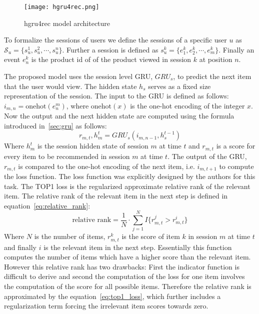 \begin{figure}[ht]
	\centering
	\captionsetup{width=0.8\textwidth}
    \texttt{[image: hgru4rec.png]}
    \caption{hgru4rec model architecture}
    \label{fig:hgru4rec}
\end{figure}

To formalize the sessions of users we define the sessions of a specific user $u$ as $\mathcal{S}_u = \lbrace s_u^1, s_u^2, \cdots, s_u^n \rbrace $.
Further a session is defined as $s_u^k = \lbrace e^k_1, e^k_2, \cdots, e^k_m \rbrace $.
Finally an event $e^k_n$ is the product id of of the product viewed in session $k$ at position $n$.
\par
The proposed model uses the session level GRU, $GRU_s$, to predict the next item that the user would view.
The hidden state $h_s$ serves as a fixed size representation of the session.
The input to the GRU is defined as follows: $i_{m,n} = \text{onehot} ( e^m_n )$, where $\text{onehot}(x)$ is the one-hot encoding of the integer $x$.
Now the output and the next hidden state are computed using the formula introduced in~\ref{sec:gru} as follows:
\begin{equation}\label{eq:hgru4rec_session}
    r_{m,t}, h_m^{t} = GRU_s(i_{m,n-1}, h_s^{t-1})
\end{equation}
Where $h_m^{t}$ is the session hidden state of session $m$ at time $t$ and $r_{m,t}$ is a score for every item to be recommended in session $m$ at time $t$.
The output of the GRU, $r_{m,t}$ is compared to the one-hot encoding of the next item, i.e. $i_{m,t+1}$ to compute the loss function.
The loss function was explicitly designed by the authors for this task.
The TOP1 loss is the regularized approximate relative rank of the relevant item.
The relative rank of the relevant item in the next step is defined in equation~\ref{eq:relative_rank}:
\begin{equation}\label{eq:relative_rank}
    \text{relative rank} = \frac{1}{N}\cdot \sum_{j=1}^{N} I\lbrace r_{m,t}^j > r_{m,t}^i \rbrace
\end{equation}
Where $N$ is the number of items, $r_{m,t}^k$ is the score of item $k$ in session $m$ at time $t$ and finally $i$ is the relevant item in the next step.
Essentially this function computes the number of items which have a higher score than the relevant item.
However this relative rank has two drawbacks: First the indicator function is difficult to derive and second the computation of the loss for one item involves the computation of the score for all possible items.
Therefore the relative rank is approximated by the equation~\ref{eq:top1_loss}, which further includes a regularization term forcing the irrelevant item scores towards zero.
